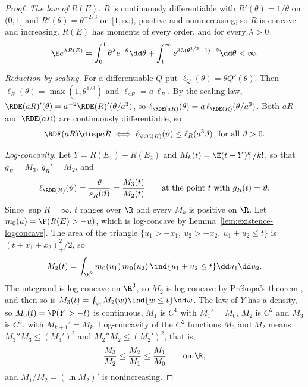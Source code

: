 \begin{proof}
\emph{The law of $R(E)$.} $R$ is continuously differentiable with $R'(\theta)=1/\theta$ on
$(0,1]$ and $R'(\theta)=\theta^{-2/3}$ on $[1,\infty)$, positive and nonincreasing; so $R$ is
concave and increasing. $R(E)$ has moments of every order, and for every $\lambda>0$
\begin{equation}\label{eq:existence-expmoment}
  \E e^{\lambda R(E)}=\int_0^1\theta^{\lambda}e^{-\theta}\dd\theta
  +\int_1^\infty e^{3\lambda(\theta^{1/3}-1)-\theta}\dd\theta<\infty .
\end{equation}

\emph{Reduction by scaling.} For a differentiable $Q$ put $\ell_Q(\theta)=\theta Q'(\theta)$.
Then $\ell_R(\theta)=\max(1,\theta^{1/3})$ and $\ell_{aR}=a\,\ell_R$. By the scaling law,
$\RDE(aR)'(\theta)=a^{-2}\RDE(R)'(\theta/a^3)$, so
$\ell_{\RDE(aR)}(\theta)=a\,\ell_{\RDE(R)}(\theta/a^3)$. Both $aR$ and $\RDE(aR)$ are
continuously differentiable, so
\begin{equation}\label{eq:existence-super-red}
  \RDE(aR)\disp aR\iff\ell_{\RDE(R)}(\vartheta)\le\ell_R(a^3\vartheta)\ \text{ for all }\vartheta>0 .
\end{equation}

\emph{Log-concavity.} Let $Y=R(E_1)+R(E_2)$ and $M_k(t)=\E(t+Y)_+^k/k!$, so that $g_R=M_3$,
$g_R'=M_2$, and
\[
  \ell_{\RDE(R)}(\vartheta)=\frac{\vartheta}{s_R(\vartheta)}=\frac{M_3(t)}{M_2(t)}
  \qquad\text{at the point $t$ with }g_R(t)=\vartheta .
\]
Since $\sup R=\infty$, $t$ ranges over $\R$ and every $M_k$ is positive on $\R$. Let
$m_0(u)=\P(R(E)>-u)$, which is log-concave by Lemma~\ref{lem:existence-logconcave}. The area
of the triangle $\{u_1>-x_1,\ u_2>-x_2,\ u_1+u_2\le t\}$ is $(t+x_1+x_2)_+^2/2$, so
\[
  M_2(t)=\int_{\R^2}m_0(u_1)\,m_0(u_2)\,\ind\{u_1+u_2\le t\}\dd u_1\dd u_2 .
\]
The integrand is log-concave on $\R^3$, so $M_2$ is log-concave by Pr\'ekopa's theorem
\cite{Prekopa73}, and then so is $M_3(t)=\int_\R M_2(w)\ind\{w\le t\}\dd w$. The law of $Y$ has
a density, so $M_0(t)=\P(Y>-t)$ is continuous, $M_1$ is $C^1$ with $M_1'=M_0$, $M_2$ is $C^2$
and $M_3$ is $C^3$, with $M_{k+1}'=M_k$. Log-concavity of the $C^2$ functions $M_3$ and $M_2$
means $M_3''M_3\le(M_3')^2$ and $M_2''M_2\le(M_2')^2$, that is,
\begin{equation}\label{eq:existence-ratios}
  \frac{M_3}{M_2}\le\frac{M_2}{M_1}\le\frac{M_1}{M_0}\qquad\text{on }\R,
\end{equation}
and $M_1/M_2=(\ln M_2)'$ is nonincreasing.


\end{proof}
